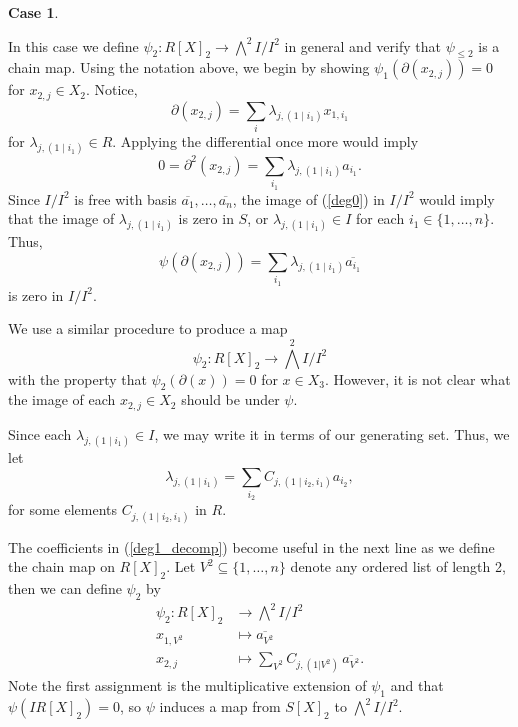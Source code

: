 \documentclass{amsart}
\theoremstyle{definition}
\newtheorem{case}[theorem]{Case}
\theoremstyle{remark}
\begin{document}
\begin{case}
\label{wedge2}

In this case we define $\psi_2: R[ X ]_{2} \to \bigwedge^2I/I^2$ in general and verify that $\psi_{\leq 2} $ is a chain map. 
Using the notation above, we begin by showing $\psi_{1}(\partial(x_{2,j}))=0$ for $x_{2,j}\in X_2$. Notice, 
\[
\partial(x_{2,j}) = \sum_{i} \lambda_{j,(1 \mid i_1)}x_{1,i_1}
\]
for $\lambda_{j,(1\mid i_1)}\in R$. Applying the differential once more would imply
\begin{equation}
\label{deg0}
   0= \partial^2(x_{2,j})= \sum_{i_1}\lambda_{j,(1 \mid i_1 )}a_{i_1}.
\end{equation}
Since $I/I^2$ is free with basis $\overline{a_1},\ldots, \overline{a_n}$, the image of (\ref{deg0}) in $I/I^2$ would imply that the image of $\lambda_{j,(1\mid i_1)}$ is zero in $S$, or $\lambda_{j,(1 \mid i_1)} \in I$ for each $i_1 \in \{1,\ldots, n\}$. Thus, 
\[
\psi(\partial(x_{2,j}))= \sum_{i_1} \lambda_{j,(1\mid i_1)}\overline{a_{i_1}}
\]is zero in $I/I^2$.

We use a similar procedure to produce a map $$\psi_2 : R[ X]_2 \to \bigwedge^2I/I^2 $$ with the property that $\psi_2\left(\partial(x)\right)=0$ for $x\in X_3$. However, it is not clear what the image of each $x_{2,j}\in X_2$ should be under $\psi$. 


Since each $\lambda_{j,(1\mid i_1)} \in I$, we may write it in terms of our generating set. Thus, we let
\begin{equation}
\label{deg1_decomp}
\lambda_{j,(1\mid i_1)}= \sum_{i_2} C_{j,(1\mid i_2,i_1)}a_{i_2},
\end{equation}
for some elements $C_{j,(1\mid i_2,i_1)}$ in $R$.

The coefficients in (\ref{deg1_decomp}) become useful in the next line as we define the chain map on $R[ X ]_{2}$. Let $V^{2} \subseteq \{1,\ldots,n\}$ denote any ordered list of length 2, then we can define $\psi_{2}$ by 
\begin{align*}
    \psi_2: R[ X]_{2}  &\to \bigwedge^{2} I/I^2\\
    x_{1,V^2} &\mapsto \overline{a_{V^2}}  \\
    x_{2,j} &\mapsto \sum_{V^2}C_{j,(1|V^2)} \,  \overline{a_{V^2}}.
\end{align*}
Note the first assignment is the multiplicative extension of $\psi_1$ and that $\psi(IR[ X]_{2})=0$, so $\psi$ induces a map from $S[ X]_2$ to $\bigwedge^2 I/I^2$.


\end{case}
\end{document}
